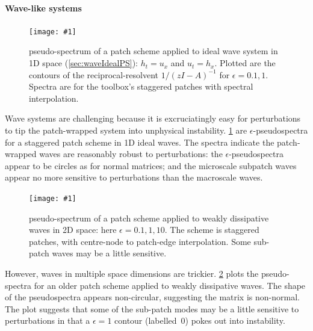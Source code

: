 \documentclass[11pt,a5paper]{article}
\newcommand\PSfig[2]{\begin{figure}\centering
    \caption{\label{fig:#1}#2}
    \texttt{[image: \#1]}
    \end{figure}}
\begin{document}
\paragraph{Wave-like systems}
\PSfig{waveIdealPS}{pseudo-spectrum of a patch scheme applied to ideal wave system in 1D space (\cref{sec:waveIdealPS}): \(h_t=u_x\) and \(u_t=h_x\).
Plotted are the contours of the reciprocal-resolvent \(1\big/(zI-A)^{-1}\) for \(\epsilon=0.1,1\).
Spectra are for the toolbox's staggered patches with spectral interpolation.}
Wave systems are challenging because it is excruciatingly easy for perturbations to tip the patch-wrapped system into unphysical instability.
\cref{fig:waveIdealPS} are \(\epsilon\)-pseudospectra for a staggered patch scheme in 1D ideal waves.  
The spectra indicate the patch-wrapped waves are reasonably robust to perturbations: the \(\epsilon\)-pseudospectra appear to be circles as for normal matrices; and the microscale subpatch waves appear no more sensitive to perturbations than the macroscale waves.


 


\PSfig{ww2DPS0}{pseudo-spectrum of a patch scheme applied to weakly dissipative waves in 2D space:  here \(\epsilon=0.1,1,10\).  
The scheme is staggered patches, with centre-node to patch-edge interpolation.
Some sub-patch waves may be a little sensitive.}
However, waves in multiple space dimensions are trickier.
\cref{fig:ww2DPS0} plots the pseudo-spectra for an older patch scheme applied to weakly dissipative waves.
The shape of the pseudospectra appears non-circular, suggesting the matrix is non-normal.
The plot suggests that some of the sub-patch modes may be a little sensitive to perturbations in that a \(\epsilon=1\) contour (labelled~0) pokes out into instability. 
\end{document}
